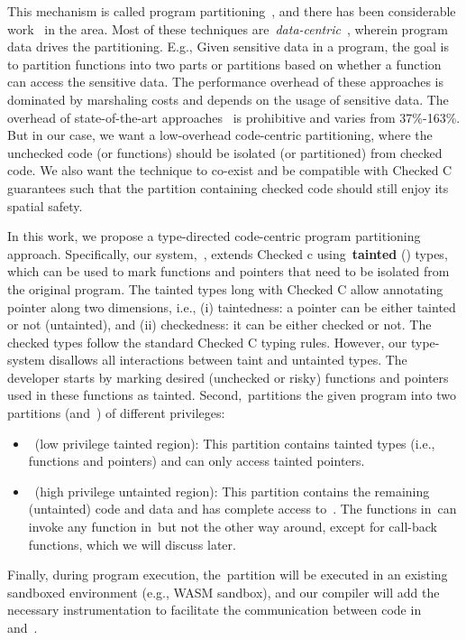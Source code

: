 {This mechanism is called program partitioning~\cite{rul2009towards}, and there has been considerable work~\cite{tan2017principles, brumley2004privtrans, bittau2008wedge, lind2017glamdring, liu2017ptrsplit} in the area. Most of these techniques are~\emph{data-centric}~\cite{lind2017glamdring, liu2017ptrsplit}, wherein program data drives the partitioning. E.g., Given sensitive data in a program, the goal is to partition functions into two parts or partitions based on whether a function can access the sensitive data.
The performance overhead of these approaches is dominated by marshaling costs and depends on the usage of sensitive data.
The overhead of state-of-the-art approaches~\cite{lind2017glamdring, liu2017ptrsplit} is prohibitive and varies from 37\%-163\%.
But in our case, we want a low-overhead code-centric partitioning, where the unchecked code (or functions) should be isolated (or partitioned) from checked code. We also want the technique to co-exist and be compatible with Checked C guarantees such that the partition containing checked code should still enjoy its spatial safety.

In this work, we propose a type-directed code-centric program partitioning approach.
Specifically, our system,~\systemname, extends Checked c using~\textbf{tainted} (\taintt) types, which can be used to mark functions and pointers that need to be isolated from the original program.
The tainted types long with Checked C allow annotating pointer along two dimensions, i.e., (i) taintedness: a pointer can be either tainted or not (untainted), and (ii) checkedness: it can be either checked or not.
The checked types follow the standard Checked C typing rules. However, our type-system disallows all interactions between taint and untainted types.
The developer starts by marking desired (unchecked or risky) functions and pointers used in these functions as tainted.
Second,~\systemname partitions the given program into two partitions (\ucregion and~\cregion)  of different privileges:
\begin{itemize}
\item~\ucregion (low privilege tainted region): This partition contains tainted types (i.e., functions and pointers) and can only access tainted pointers.
\item~\cregion (high privilege untainted region): This partition contains the remaining (untainted) code and data and has complete access to~\cregion{}.
The functions in~\cregion can invoke any function in~\ucregion but not the other way around, except for call-back functions, which we will discuss later.
\end{itemize}
Finally, during program execution, the~\ucregion partition will be executed in an existing sandboxed environment (e.g., WASM sandbox), and our compiler will add the necessary instrumentation to facilitate the communication between code in~\cregion{} and~\ucregion{}.

}
